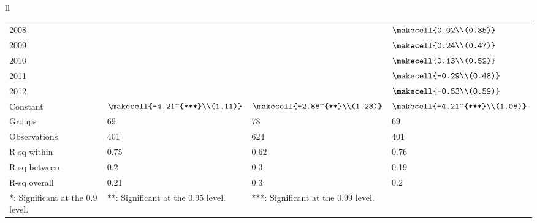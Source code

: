 \begin{tabular}{ll}
\begin{tabular}{llll}
2008                &                                   &                                  &         $\makecell{0.02\\(0.35)}$ \\
2009                &                                   &                                  &         $\makecell{0.24\\(0.47)}$ \\
2010                &                                   &                                  &         $\makecell{0.13\\(0.52)}$ \\
2011                &                                   &                                  &        $\makecell{-0.29\\(0.48)}$ \\
2012                &                                   &                                  &        $\makecell{-0.53\\(0.59)}$ \\
Constant            &  $\makecell{-4.21^{***}\\(1.11)}$ &  $\makecell{-2.88^{**}\\(1.23)}$ &  $\makecell{-4.21^{***}\\(1.08)}$ \\
Groups              &                                69 &                               78 &                                69 \\
Observations        &                               401 &                              624 &                               401 \\
R-sq within         &                              0.75 &                             0.62 &                              0.76 \\
R-sq between        &                               0.2 &                              0.3 &                              0.19 \\
R-sq overall        &                              0.21 &                              0.3 &                               0.2 \\
\bottomrule
*: Significant at the 0.9 level. & **: Significant at the 0.95 level. & ***: Significant at the 0.99 level.
\end{tabular}

\end{tabular}
